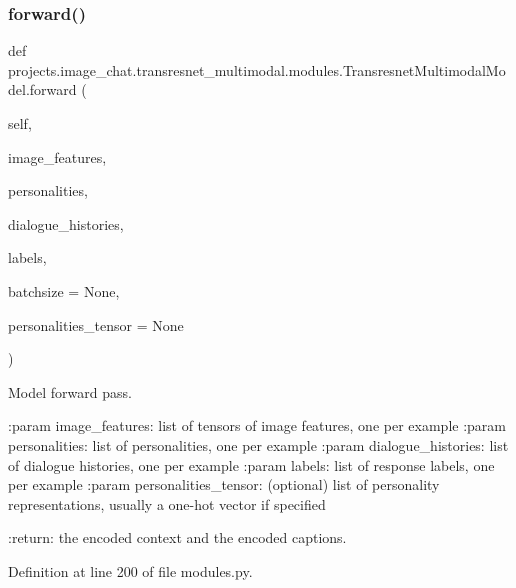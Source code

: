 \subsubsection{\texorpdfstring{forward()}{forward()}}
{\footnotesize\ttfamily def projects.\+image\+\_\+chat.\+transresnet\+\_\+multimodal.\+modules.\+Transresnet\+Multimodal\+Model.\+forward (\begin{DoxyParamCaption}\item[{}]{self,  }\item[{}]{image\+\_\+features,  }\item[{}]{personalities,  }\item[{}]{dialogue\+\_\+histories,  }\item[{}]{labels,  }\item[{}]{batchsize = {\ttfamily None},  }\item[{}]{personalities\+\_\+tensor = {\ttfamily None} }\end{DoxyParamCaption})}

\begin{DoxyVerb}Model forward pass.

:param image_features:
    list of tensors of image features, one per example
:param personalities:
    list of personalities, one per example
:param dialogue_histories:
    list of dialogue histories, one per example
:param labels:
    list of response labels, one per example
:param personalities_tensor:
    (optional) list of personality representations, usually a one-hot
    vector if specified

:return:
    the encoded context and the encoded captions.
\end{DoxyVerb}
 

Definition at line 200 of file modules.\+py.


